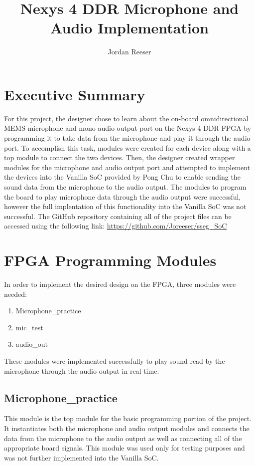 \documentclass{article}
\author{Jordan Reeser}
\title{Nexys 4 DDR Microphone and Audio Implementation}
\begin{document}
\maketitle

\section{Executive Summary}
For this project, the designer chose to learn about the on-board omnidirectional MEMS microphone and mono audio output port on the Nexys 4 DDR FPGA by programming it to take data from the microphone and play it through the audio port. To accomplish this task, modules were created for each device along with a top module to connect the two devices. Then, the designer created wrapper modules for the microphone and audio output port and attempted to implement the devices into the Vanilla SoC provided by Pong Chu to enable sending the sound data from the microphone to the audio output. The modules to program the board to play microphone data through the audio output were successful, however the full implentation of this functionality into the Vanilla SoC was not successful. 
The GitHub repository containing all of the project files can be accessed using the following link: \url{https://github.com/Joreeser/sseg_SoC}

\section{FPGA Programming Modules}
In order to implement the desired design on the FPGA, three modules were needed:

\begin{enumerate}
	\item Microphone\_practice
	\item mic\_test
	\item audio\_out
\end{enumerate}

These modules were implemented successfully to play sound read by the microphone through the audio output in real time.
	
\subsection{Microphone\_practice}
This module is the top module for the basic programming portion of the project. It instantiates both the microphone and audio output modules and connects the data from the microphone to the audio output as well as connecting all of the appropriate board signals. This module was used only for testing purposes and was not further implemented into the Vanilla SoC.
\end{document}
